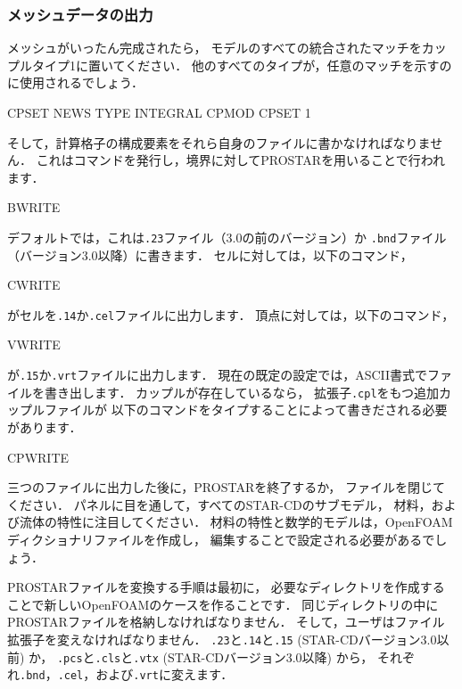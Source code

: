 \subsubsection{メッシュデータの出力}
\label{sssec:5.5.2.5}
メッシュがいったん完成されたら，
モデルのすべての統合されたマッチをカップルタイプ1に置いてください．
他のすべてのタイプが，任意のマッチを示すのに使用されるでしょう．
\begin{OFverbatim}[terminal]
CPSET NEWS TYPE INTEGRAL
CPMOD CPSET 1
\end{OFverbatim}
そして，計算格子の構成要素をそれら自身のファイルに書かなければなりません．
これはコマンドを発行し，境界に対して\textsf{PROSTAR}を用いることで行われます．
\begin{OFverbatim}[terminal]
BWRITE
\end{OFverbatim}
デフォルトでは，これは\texttt{.23}ファイル（3.0の前のバージョン）か
\texttt{.bnd}ファイル（バージョン3.0以降）に書きます．
セルに対しては，以下のコマンド，
\begin{OFverbatim}[terminal]
CWRITE
\end{OFverbatim}
がセルを\texttt{.14}か\texttt{.cel}ファイルに出力します．
頂点に対しては，以下のコマンド，
\begin{OFverbatim}[terminal]
VWRITE
\end{OFverbatim}
が\texttt{.15}か\texttt{.vrt}ファイルに出力します．
現在の既定の設定では，ASCII書式でファイルを書き出します．
カップルが存在しているなら，
拡張子\texttt{.cpl}をもつ追加カップルファイルが
以下のコマンドをタイプすることによって書きだされる必要があります．
\begin{OFverbatim}[terminal]
CPWRITE
\end{OFverbatim}
三つのファイルに出力した後に，\textsf{PROSTAR}を終了するか，
ファイルを閉じてください．
パネルに目を通して，すべてのSTAR-CDのサブモデル，
材料，および流体の特性に注目してください．
材料の特性と数学的モデルは，OpenFOAMディクショナリファイルを作成し，
編集することで設定される必要があるでしょう．

\textsf{PROSTAR}ファイルを変換する手順は最初に，
必要なディレクトリを作成することで新しいOpenFOAMのケースを作ることです．
同じディレクトリの中に\textsf{PROSTAR}ファイルを格納しなければなりません．
そして，ユーザはファイル拡張子を変えなければなりません．
\texttt{.23}と\texttt{.14}と\texttt{.15} (STAR-CDバージョン3.0以前) か，
\texttt{.pcs}と\texttt{.cls}と\texttt{.vtx} (STAR-CDバージョン3.0以降) から，
それぞれ\texttt{.bnd}，\texttt{.cel}，および\texttt{.vrt}に変えます．

